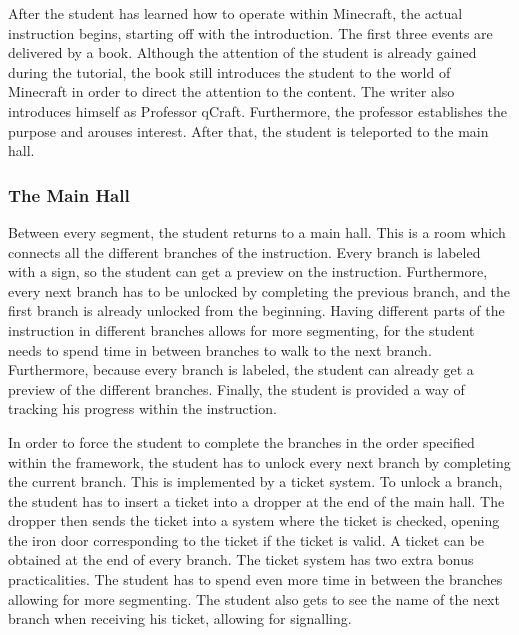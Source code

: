 \documentclass[11pt,twoside]{report} %
\begin{document}
After the student has learned how to operate within Minecraft, the actual instruction begins, starting off with the introduction. The first three events are delivered by a book. Although the attention of the student is already gained during the tutorial, the book still introduces the student to the world of Minecraft in order to direct the attention to the content. The writer also introduces himself as Professor qCraft. Furthermore, the professor establishes the purpose and arouses interest. After that, the student is teleported to the main hall.

\subsubsection{The Main Hall}

Between every segment, the student returns to a main hall. This is a room which connects all the different branches of the instruction. Every branch is labeled with a sign, so the student can get a preview on the instruction. Furthermore, every next branch has to be unlocked by completing the previous branch, and the first branch is already unlocked from the beginning. Having different parts of the instruction in different branches allows for more segmenting, for the student needs to spend time in between branches to walk to the next branch. Furthermore, because every branch is labeled, the student can already get a preview of the different branches. Finally, the student is provided a way of tracking his progress within the instruction.

In order to force the student to complete the branches in the order specified within the framework, the student has to unlock every next branch by completing the current branch. This is implemented by a ticket system. To unlock a branch, the student has to insert a ticket into a dropper at the end of the main hall. The dropper then sends the ticket into a system where the ticket is checked, opening the iron door corresponding to the ticket if the ticket is valid. A ticket can be obtained at the end of every branch. The ticket system has two extra bonus practicalities. The student has to spend even more time in between the branches allowing for more segmenting. The student also gets to see the name of the next branch when receiving his ticket, allowing for signalling.
\end{document}
